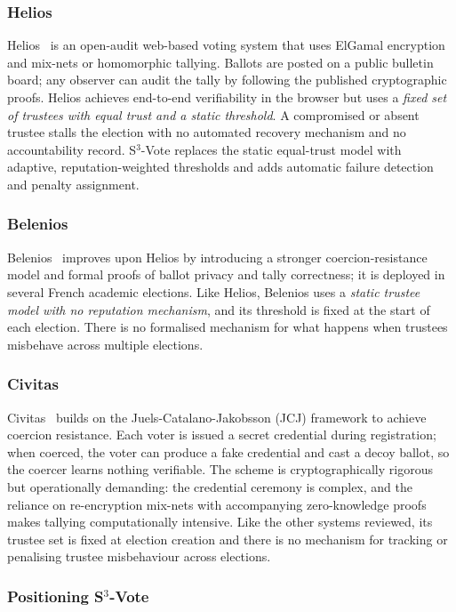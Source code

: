 \documentclass[12pt,a4paper]{article}
\theoremstyle{definition}
\theoremstyle{remark}
\begin{document}
\subsubsection*{Helios}
Helios~\cite{adida2008} is an open-audit web-based voting system that
uses ElGamal encryption and mix-nets or homomorphic tallying.
Ballots are posted on a public bulletin board; any observer can audit
the tally by following the published cryptographic proofs.
Helios achieves end-to-end verifiability in the browser but uses a
\emph{fixed set of trustees with equal trust and a static threshold}.
A compromised or absent trustee stalls the election with no automated
recovery mechanism and no accountability record.
S$^3$-Vote replaces the static equal-trust model with adaptive,
reputation-weighted thresholds and adds automatic failure detection
and penalty assignment.

\subsubsection*{Belenios}
Belenios~\cite{cortier2013} improves upon Helios by introducing a
stronger coercion-resistance model and formal proofs of ballot privacy
and tally correctness; it is deployed in several French academic elections.
Like Helios, Belenios uses a \emph{static trustee model with no reputation
mechanism}, and its threshold is fixed at the start of each election.
There is no formalised mechanism for what happens when trustees
misbehave across multiple elections.

\subsubsection*{Civitas}
Civitas~\cite{clarkson2008} builds on the Juels-Catalano-Jakobsson (JCJ)
framework to achieve coercion resistance.
Each voter is issued a secret credential during registration; when coerced,
the voter can produce a fake credential and cast a decoy ballot, so the
coercer learns nothing verifiable.
The scheme is cryptographically rigorous but operationally demanding:
the credential ceremony is complex, and the reliance on re-encryption
mix-nets with accompanying zero-knowledge proofs makes tallying
computationally intensive.
Like the other systems reviewed, its trustee set is fixed at election
creation and there is no mechanism for tracking or penalising trustee
misbehaviour across elections.

\subsubsection*{Positioning S$^3$-Vote}
\end{document}
